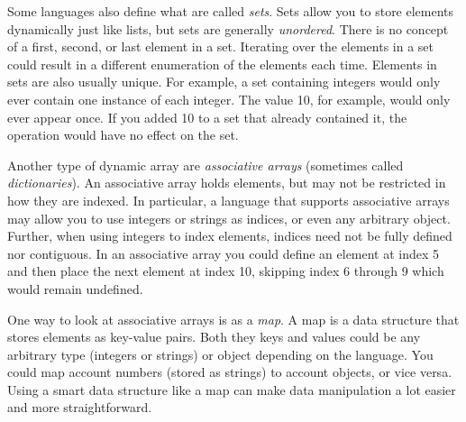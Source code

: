 Some languages also define what are called \emph{sets}.  Sets allow
you to store elements dynamically just like lists, but sets are generally
\emph{unordered}.  There is no concept of a first, second, or last 
element in a set.  Iterating over the elements in a set could result
in a different enumeration of the elements each time.  Elements in
sets are also usually unique.  For example, a set containing integers
would only ever contain one instance of each integer.  The value 10,
for example, would only ever appear once.  If you added 10 to a set
that already contained it, the operation would have no effect on the
set.

Another type of dynamic array are \emph{associative arrays} (sometimes
called \emph{dictionaries}).  An associative array
holds elements, but may not be restricted in how they are indexed.
In particular, a language that supports associative arrays may allow 
you to use integers or strings as indices, or even any arbitrary object.
Further, when using integers to index elements, indices need not
be fully defined nor contiguous.  In an associative array you could
define an element at index 5 and then place the next element at index
10, skipping index 6 through 9 which would remain undefined.

One way to look at associative arrays is as a \emph{map}.  A map
is a data structure that stores elements as key-value pairs.  Both 
they keys and values could be any arbitrary type (integers or strings)
or object depending on the language.  You could map account
numbers (stored as strings) to account objects, or vice versa.  Using
a smart data structure like a map can make data manipulation a
lot easier and more straightforward.





